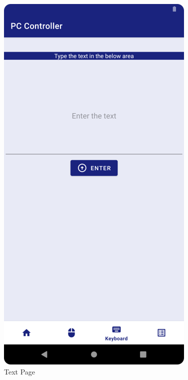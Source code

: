 \documentclass[12pt]{article}
\begin{document}
 \begin{figure}[h]
 \centering
 \includegraphics[scale=.5]{Output3}
  \caption{Text Page}
 \end{figure}
\end{document}
